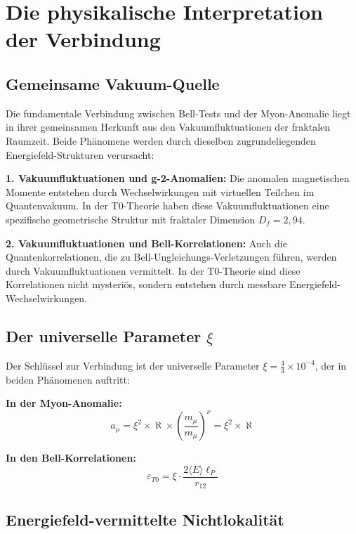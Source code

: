 \documentclass[12pt,a4paper]{article}
\begin{document}
	
	\section{Die physikalische Interpretation der Verbindung}
	
	
		\subsection{Gemeinsame Vakuum-Quelle}
		
		Die fundamentale Verbindung zwischen Bell-Tests und der Myon-Anomalie liegt in ihrer gemeinsamen Herkunft aus den Vakuumfluktuationen der fraktalen Raumzeit. Beide Ph\"anomene werden durch dieselben zugrundeliegenden Energiefeld-Strukturen verursacht:
		
		\textbf{1. Vakuumfluktuationen und g-2-Anomalien:}
		Die anomalen magnetischen Momente entstehen durch Wechselwirkungen mit virtuellen Teilchen im Quantenvakuum. In der T0-Theorie haben diese Vakuumfluktuationen eine spezifische geometrische Struktur mit fraktaler Dimension $D_f = 2{,}94$.
		
		\textbf{2. Vakuumfluktuationen und Bell-Korrelationen:}
		Auch die Quantenkorrelationen, die zu Bell-Ungleichungs-Verletzungen f\"uhren, werden durch Vakuumfluktuationen vermittelt. In der T0-Theorie sind diese Korrelationen nicht mysteri\"os, sondern entstehen durch messbare Energiefeld-Wechselwirkungen.
		
		\subsection{Der universelle Parameter $\xi$}
		
		Der Schl\"ussel zur Verbindung ist der universelle Parameter $\xi = \frac{4}{3} \times 10^{-4}$, der in beiden Ph\"anomenen auftritt:
		
		\textbf{In der Myon-Anomalie:}
		\begin{equation}
			a_\mu = \xi^2 \times \aleph \times \left(\frac{m_\mu}{m_\mu}\right)^\nu = \xi^2 \times \aleph
		\end{equation}
		
		\textbf{In den Bell-Korrelationen:}
		\begin{equation}
			\varepsilon_{T0} = \xi \cdot \frac{2\langle E \rangle \ell_P}{r_{12}}
		\end{equation}
		
		\subsection{Energiefeld-vermittelte Nichtlokalit\"at}
		
\end{document}
